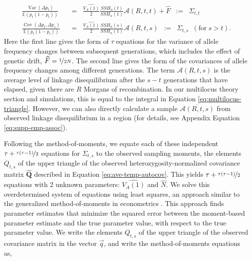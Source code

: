\documentclass[11pt]{article}
\newcommand{\E}{\mathbb{E}}
\DeclareMathOperator{\var}{Var}
\DeclareMathOperator{\cov}{Cov}
\newcommand{\nssh}{SSH_n}
\begin{document}
\begin{align}
  \frac{\var(\Delta p_t)}{\E(p_t ( 1- p_t))} \; \; &= \; \;
                                                     \frac{\widehat{V_A(1)}}{2}
                                                     \frac{\nssh(t)}{
                                                     \nssh(1)}
                                                     \mathcal{A}(R, t,t)
                                                     + \widehat{F} \;\; :=  \;\; \Sigma_{t,t}  \label{eq:mom-moments-var} \\
  \frac{\cov(\Delta p_t, \Delta p_s)}{\E(p_{t} (1-p_{t}))} \;\; &= \;\; \frac{\widehat{V_A(1)}}{2}\frac{\nssh(s)}{ \nssh(1)} \mathcal{A}(R, t,s) \;\; := \;\; \Sigma_{t,s} \; \; (\text{for} \; s > t ).
 \label{eq:mom-moments-cov}
\end{align}
%
Here the first line gives the form of $\tau$ equations for the variance of
allele  frequency changes between subsequent generations, which includes the
effect of genetic drift, $\widehat{F} =\nicefrac{1}{2N}$. The second line gives
the form of the covariances of allele frequency changes among different
generations. The term $\mathcal{A}(R, t,s)$ is the average level of linkage
disequilibrium after the $s-t$ generations that have elapsed, given there are
$R$ Morgans of recombination. In our multilocus theory section and simulations,
this is equal to the integral in Equation \eqref{eq:multilocus-triangle}.
However, we can also directly calculate a sample $\overline{\mathcal{A}(R,
t,s)}$ from observed linkage disequilibrium in a region (for details, see
Appendix Equation \eqref{eq:supp-emp-assoc}).

Following the method-of-moments, we equate each of these independent $\tau +
\nicefrac{\tau(\tau-1)}{2}$ equations for $\Sigma_{t,s}$ to the observed
sampling moments, the elements $Q_{t,s}$ of the upper triangle of the observed
heterozygosity-normalized covariance matrix $\mathbf{\widehat{Q}}$ described in
Equation \eqref{eq:ave-temp-autocov}. This yields $\tau + \nicefrac{\tau (\tau
- 1)}{2}$ equations with 2 unknown parameters: $\widehat{V_A(1)}$ and
$\widehat{N}$. We solve this overdetermined system of equations using least
squares, an approach similar to the generalized method-of-moments in
econometrics \parencite{Hansen1982-ck}. This approach finds parameter estimates
that minimize the squared error between the moment-based parameter estimate and
the true parameter value, with respect to the true parameter value. We write
the elements $Q_{t,s}$ of the upper triangle of the observed covariance matrix
in the vector $\vec{q}$, and write the method-of-moments equations as,
\end{document}
